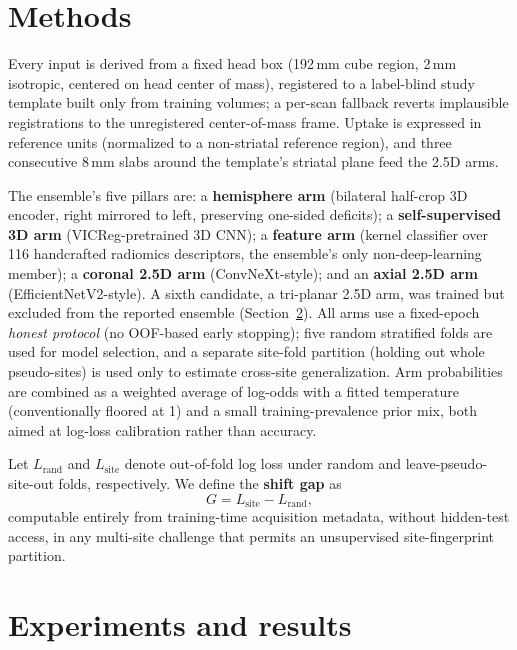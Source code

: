 \documentclass{article}
\newcommand{\shiftgap}{\ensuremath{G}}
\newcommand{\lrand}{\ensuremath{L_{\text{rand}}}}
\newcommand{\lsite}{\ensuremath{L_{\text{site}}}}
\begin{document}
\section{Methods}
\label{sec:methods}

Every input is derived from a fixed head box (192\,mm cube region, 2\,mm isotropic, centered on head center of mass), registered to a label-blind study template built only from training volumes; a per-scan fallback reverts implausible registrations to the unregistered center-of-mass frame. Uptake is expressed in reference units (normalized to a non-striatal reference region), and three consecutive 8\,mm slabs around the template's striatal plane feed the 2.5D arms.

The ensemble's five pillars are: a \textbf{hemisphere arm} (bilateral half-crop 3D encoder, right mirrored to left, preserving one-sided deficits); a \textbf{self-supervised 3D arm} (VICReg-pretrained 3D CNN); a \textbf{feature arm} (kernel classifier over 116 handcrafted radiomics descriptors, the ensemble's only non-deep-learning member); a \textbf{coronal 2.5D arm} (ConvNeXt-style); and an \textbf{axial 2.5D arm} (EfficientNetV2-style). A sixth candidate, a tri-planar 2.5D arm, was trained but excluded from the reported ensemble (Section~\ref{sec:results}). All arms use a fixed-epoch \emph{honest protocol} (no OOF-based early stopping); five random stratified folds are used for model selection, and a separate site-fold partition (holding out whole pseudo-sites) is used only to estimate cross-site generalization. Arm probabilities are combined as a weighted average of log-odds with a fitted temperature (conventionally floored at 1) and a small training-prevalence prior mix, both aimed at log-loss calibration rather than accuracy.

Let \lrand{} and \lsite{} denote out-of-fold log loss under random and leave-pseudo-site-out folds, respectively. We define the \textbf{shift gap} as
\begin{equation}
\shiftgap = \lsite - \lrand,
\label{eq:shiftgap}
\end{equation}
computable entirely from training-time acquisition metadata, without hidden-test access, in any multi-site challenge that permits an unsupervised site-fingerprint partition.

\section{Experiments and results}
\label{sec:results}
\end{document}
